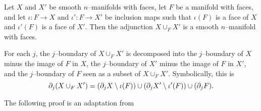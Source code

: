 \begin{prop}
	\label{prop:addface}
	Let $X$ and $X'$ be smooth $n$--manifolds with faces, let $F$ be a manifold with faces, and let $\iota:F\to X$ and $\iota':F\to X'$ be inclusion maps such that $\iota(F)$ is a face of $X$ and $\iota'(F)$ is a face of $X'$.
	Then the adjunction $X\cup_F X'$ is a smooth $n$--manifold with faces.
	
	For each $j$, the $j$--boundary of $X\cup_F X'$ is decomposed into the $j$--boundary of $X$ minus the image of $F$ in $X$, the $j$--boundary of $X'$ minus the image of $F$ in $X'$, and the $j$--boundary of $F$ seen as a subset of $X\cup_F X'$.
	Symbolically, this is $$\partial_j( X \cup_F X') = (\partial_j X\setminus \iota(F))\cup(\partial_j X'\setminus \iota'(F))\cup(\partial_j F).$$
\end{prop}

The following proof is an adaptation from \cite{davis}

